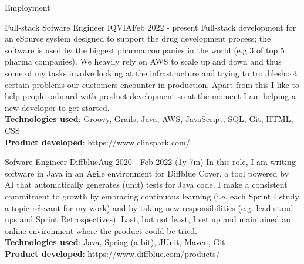\documentclass[]{mcdowellcv}
\begin{document}
  \begin{cvsection}{Employment}

	    \begin{cvsubsection}{Full-stack Sofware Engineer }{IQVIA}{Feb 2022 - present}
			\hspace{\parindent} \hspace{\parindent} \hspace{\parindent} \hspace{\parindent} Full-stack development for an eSource system designed to support the drug development process; the software is used by the biggest pharma companies in the world (e.g 3 of top 5 pharma companies). We heavily rely on AWS to scale up and down and thus some of my tasks involve looking at the infrastructure and trying to troubleshoot certain problems our customers encounter in production. Apart from this I like to help people onboard with product development so at the moment I am helping a new developer to get started.
			\\ \textbf{Technologies used}: Groovy, Grails, Java, AWS, JavaScript, SQL, Git, HTML, CSS
			\\ \textbf{Product developed}: https://www.clinspark.com/
		\end{cvsubsection}

   	    \begin{cvsubsection}{Sofware Engineer }{Diffblue}{Aug 2020 - Feb 2022 (1y 7m)}
			\hspace{\parindent} \hspace{\parindent} \hspace{\parindent} \hspace{\parindent} In this role, I am writing software in Java in an Agile environment for Diffblue Cover, a tool powered by AI that automatically generates (unit) tests for Java code. I make a consistent commitment to growth by embracing continuous learning (i.e. each Sprint I study a topic relevant for my work) and by taking new responsibilities (e.g. lead stand-ups and Sprint Retrospectives). Last, but not least, I set up and maintained an online environment where the product could be tried.
      		\\ \textbf{Technologies used}: Java, Spring (a bit), JUnit, Maven, Git
	  		\\ \textbf{Product developed}: https://www.diffblue.com/products/
		\end{cvsubsection}


\end{cvsection}
\end{document}
